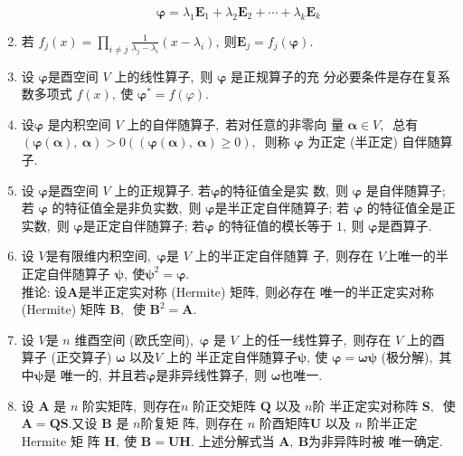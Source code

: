 \begin{enumerate}
		$$\boldsymbol{\varphi}=\lambda_{1} \boldsymbol{E}_{1}+\lambda_{2} \boldsymbol{E}_{2}+\cdots+\lambda_{k} \boldsymbol{E}_{k}$$
		\item 若  $f_{j}(x)=\prod_{i \neq j} \frac{1}{\lambda_{j}-\lambda_{i}}\left(x-\lambda_{i}\right) ,\  $则$ \boldsymbol{E}_{j}=f_{j}(\boldsymbol{\varphi}) .$
		\item 设  $\boldsymbol{\varphi}$是酉空间  $V $ 上的线性算子,\  则 $ \boldsymbol{\varphi}$ 是正规算子的充 分必要条件是存在复系数多项式 $ f(x) ,\  $使 $ \boldsymbol{\varphi}^{*}=f(\varphi) .$
		\item 设$\boldsymbol{\varphi}$  是内积空间  $V $ 上的自伴随算子,\  若对任意的非零向 量  $\boldsymbol{\alpha} \in V ,\ $ 总有  $(\boldsymbol{\varphi}(\boldsymbol{\alpha}),\  \boldsymbol{\alpha})>0((\boldsymbol{\varphi}(\boldsymbol{\alpha}),\  \boldsymbol{\alpha}) \geqslant 0) ,\ $ 则称  $\boldsymbol{\varphi}$ 为正定 (半正定) 自伴随算子.
		\item 设 $\boldsymbol{\varphi}$是酉空间 $ V$  上的正规算子. 若$  \boldsymbol{\varphi}$的特征值全是实 数,\  则 $\boldsymbol{\varphi}$ 是自伴随算子; 若 $\boldsymbol{\varphi}$ 的特征值全是非负实数,\  则 $\boldsymbol{\varphi}$是半正定自伴随算子; 若 $\boldsymbol{\varphi}$ 的特征值全是正实数,\  则 $\boldsymbol{\varphi}$是正定自伴随算子; 若$\boldsymbol{\varphi}$ 的特征值的模长等于 $1 ,\  $则 $ \boldsymbol{\varphi}$是酉算子.
		\item 设  $V  $是有限维内积空间,\  $ \boldsymbol{\varphi}  $是 $ V$  上的半正定自伴随算 子,\  则存在 $ V $上唯一的半正定自伴随算子 $ \boldsymbol{\psi},\  $使$  \boldsymbol{\psi}^{2}=\boldsymbol{\varphi}.$\\
		推论: 设$\boldsymbol{A}$是半正定实对称 (Hermite) 矩阵,\  则必存在 唯一的半正定实对称 (Hermite) 矩阵  $\boldsymbol{B} ,\ $ 使 $ \boldsymbol{B}^{2}=\boldsymbol{A} .$
		\item 设 $ V  $是 $ n $ 维酉空间 (欧氏空间),\  $ \boldsymbol{\varphi}$  是 $ V $ 上的任一线性算子,\  则存在  $V $ 上的酉算子 (正交算子)  $\boldsymbol{\omega}$ 以及$  V$  上的 半正定自伴随算子$  \boldsymbol{\psi} ,\  $使  $\boldsymbol{\varphi}=\boldsymbol{\omega}\boldsymbol{\psi}$  (极分解),\  其中$\boldsymbol{\psi}$是 唯一的,\  并且若$ \boldsymbol{\varphi} $是非异线性算子,\  则 $\boldsymbol{\omega} $也唯一.
		\item 设 $ \boldsymbol{A}$  是 $ n$  阶实矩阵,\  则存在$  n$  阶正交矩阵  $\boldsymbol{Q} $ 以及 $ n  $阶 半正定实对称阵 $ \boldsymbol{S} ,\ $ 使  $\boldsymbol{A}=\boldsymbol{Q S} . $又设  $\boldsymbol{B} $ 是  $n  $阶复矩 阵,\  则存在 $ n$  阶酉矩阵$  \boldsymbol{U}$ 以及 $ n$  阶半正定 Hermite 矩 阵  $\boldsymbol{H} ,\  $使  $\boldsymbol{B}=\boldsymbol{U} \boldsymbol{H} .$ 上述分解式当 $ \boldsymbol{A},\  \boldsymbol{B}  $为非异阵时被 唯一确定.

\end{enumerate}
